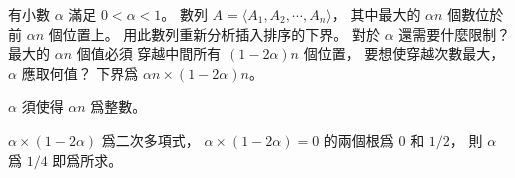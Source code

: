 \startEXERCISE
有小數 $\alpha$ 滿足 $0<\alpha<1$。
數列 $A=\langle A_1,A_2,\cdots,A_n\rangle$，
其中最大的 $\alpha n$ 個數位於前 $\alpha n$ 個位置上。
用此數列重新分析插入排序的下界。
對於 $\alpha$ 還需要什麼限制？
最大的 $\alpha n$ 個值必須
穿越中間所有 $(1-2\alpha)n$ 個位置，
要想使穿越次數最大， $\alpha$ 應取何值？
\stopEXERCISE
\startANSWER
下界爲 $\alpha n \times (1-2\alpha)n$。

$\alpha$ 須使得 $\alpha n$ 爲整數。

$\alpha\times(1-2\alpha)$ 爲二次多項式，
$\alpha\times(1-2\alpha)=0$ 的兩個根爲 $0$ 和 $1/2$，
則 $\alpha$ 爲 $1/4$ 即爲所求。
\stopANSWER
